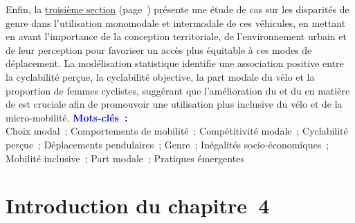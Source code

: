\begin{refsegment}
\begin{tcolorbox}
{Enfin, la \hyperref[section-chap4:cyclabilite-genre]{troisième section} (page~\pageref{section-chap4:cyclabilite-genre}) présente une étude de cas sur les disparités de genre dans l'utilisation monomodale et intermodale de ces véhicules, en mettant en avant l'importance de la conception territoriale, de l'environnement urbain et de leur perception pour favoriser un accès plus équitable à ces modes de déplacement. La modélisation statistique identifie une association positive entre la cyclabilité perçue, la cyclabilité objective, la part modale du vélo et la proportion de femmes cyclistes, suggérant que l'amélioration du  et du  en matière de  est cruciale afin de promouvoir une utilisation plus inclusive du vélo et de la micro-mobilité.%
    }
    \tcblower
\Large{\textcolor{blue}{\textbf{Mots-clés~:}}}
    \\
    \small{
Choix modal~;
Comportements de mobilité~;
Compétitivité modale~;
Cyclabilité perçue~;
Déplacements pendulaires~;
Genre~;
Inégalités socio-économiques~;
Mobilité inclusive~;
Part modale~;
Pratiques émergentes
    }
    \end{tcolorbox}

    \newpage
\section*{Introduction du chapitre~4
    \label{chap4:introduction}
    }


\end{refsegment}
